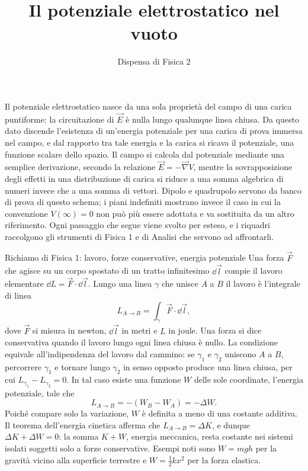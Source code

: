 \documentclass[11pt,a4paper]{article}
\title{Il potenziale elettrostatico nel vuoto}
\author{Dispensa di Fisica 2}
\date{}
\begin{document}
\maketitle

Il potenziale elettrostatico nasce da una sola proprietà del campo di una carica puntiforme: la circuitazione di $\vec E$ è nulla lungo qualunque linea chiusa. Da questo dato discende l'esistenza di un'energia potenziale per una carica di prova immersa nel campo, e dal rapporto tra tale energia e la carica si ricava il potenziale, una funzione scalare dello spazio. Il campo si calcola dal potenziale mediante una semplice derivazione, secondo la relazione $\vec E=-\vec \nabla V$, mentre la sovrapposizione degli effetti in una distribuzione di carica si riduce a una somma algebrica di numeri invece che a una somma di vettori. Dipolo e quadrupolo servono da banco di prova di questo schema; i piani indefiniti mostrano invece il caso in cui la convenzione $V(\infty)=0$ non può più essere adottata e va sostituita da un altro riferimento. Ogni passaggio che segue viene svolto per esteso, e i riquadri raccolgono gli strumenti di Fisica 1 e di Analisi che servono ad affrontarli.

\begin{riquadro}{Richiamo di Fisica 1: lavoro, forze conservative, energia potenziale}
Una forza $\vec F$ che agisce su un corpo spostato di un tratto infinitesimo $\dd\vec l$ compie il lavoro elementare $\dd L=\vec F\cdot\dd\vec l$. Lungo una linea $\gamma$ che unisce $A$ a $B$ il lavoro è l'integrale di linea
\[
L_{A\to B}=\int_{\gamma}\vec F\cdot\dd\vec l ,
\]
dove $\vec F$ si misura in newton, $\dd\vec l$ in metri e $L$ in joule. Una forza si dice conservativa quando il lavoro lungo ogni linea chiusa è nullo. La condizione equivale all'indipendenza del lavoro dal cammino: se $\gamma_1$ e $\gamma_2$ uniscono $A$ a $B$, percorrere $\gamma_1$ e tornare lungo $\gamma_2$ in senso opposto produce una linea chiusa, per cui $L_{\gamma_1}-L_{\gamma_2}=0$. In tal caso esiste una funzione $W$ delle sole coordinate, l'energia potenziale, tale che
\[
L_{A\to B}=-(W_B-W_A)=-\Delta W .
\]
Poiché compare solo la variazione, $W$ è definita a meno di una costante additiva. Il teorema dell'energia cinetica afferma che $L_{A\to B}=\Delta K$, e dunque $\Delta K+\Delta W=0$: la somma $K+W$, energia meccanica, resta costante nei sistemi isolati soggetti solo a forze conservative. Esempi noti sono $W=mgh$ per la gravità vicino alla superficie terrestre e $W=\tfrac12 kx^2$ per la forza elastica.
\end{riquadro}
\end{document}
